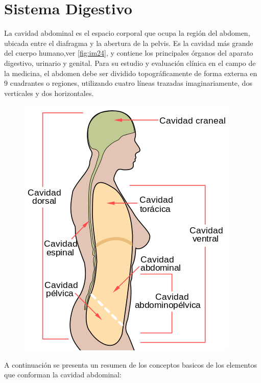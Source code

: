 \section{Sistema Digestivo}
La cavidad abdominal es el espacio corporal que ocupa la región del abdomen, ubicada entre el diafragma y la abertura de la pelvis. 
Es la cavidad más grande del cuerpo humano,ver \ref{fig:im24}, y contiene los principales órganos del aparato digestivo, urinario y genital.
Para su estudio y evaluación clínica en el campo de la medicina, el abdomen debe ser dividido topográficamente de forma externa en 9 
cuadrantes o regiones, utilizando cuatro líneas trazadas imaginariamente, dos verticales y dos horizontales.\cite{web12} %
\begin{figure}[H]
	\begin{center}
 		\includegraphics[width = .3\textwidth]{source/images/image56.png}
	\end{center} 
\end{figure} %
A continuación se presenta un resumen de los conceptos basicos de los elementos que conforman la cavidad abdominal:
